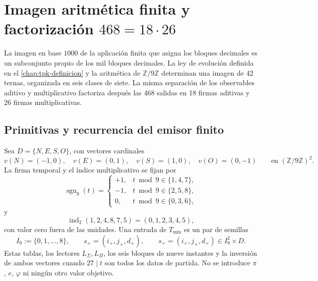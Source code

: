 \chapter[Imagen aritmética finita y factorización \(468=18\cdot26\)]{Imagen aritmética finita y factorización \(468=18\cdot26\)}
\label{chap:alfabeto-42}

La imagen en base \(1000\) de la aplicación finita que asigna los bloques decimales es un
subconjunto propio de los mil bloques decimales. La ley de evolución definida en el
\cref{chap:tpk-definicion} y la aritmética de \(\mathbb Z/9\mathbb Z\)
determinan una imagen de 42 ternas, organizada en seis clases de siete. La
misma separación de los observables aditivo y multiplicativo factoriza después las 468
salidas en 18 firmas aditivas y 26 firmas multiplicativas.

\section{Primitivas y recurrencia del emisor finito}

\begin{definition}
\label{pf84:E02-15}
Sea \(D=\{N,E,S,O\}\), con vectores cardinales
\[
 v(N)=(-1,0),\quad v(E)=(0,1),\quad
 v(S)=(1,0),\quad v(O)=(0,-1)
 \qquad\text{en }(\mathbb Z/9\mathbb Z)^2.
\]
La firma temporal y el índice multiplicativo se fijan por
\[
 \operatorname{sgn}_9(t)=
 \begin{cases}
 +1,&t\bmod9\in\{1,4,7\},\\
 -1,&t\bmod9\in\{2,5,8\},\\
 0,&t\bmod9\in\{0,3,6\},
 \end{cases}
\]
y
\[
 \operatorname{ind}_2(1,2,4,8,7,5)=(0,1,2,3,4,5),
\]
con valor cero fuera de las unidades. Una entrada de \(T_{\min}\) es un par
de semillas
\[
 I_9:=\{0,1,\ldots,8\},\qquad
 s_+=(i_+,j_+,d_+),\qquad s_\times=(i_\times,j_\times,d_\times)
 \in I_9^2\times D.
\]
Estas tablas, los lectores \(L_\Sigma,L_\Pi\), los seis bloques de nueve
instantes y la inversión de ambos vectores cuando \(27\mid t\) son todos los
datos de partida. No se introduce \(\pi\), \(e\), \(\varphi\) ni ningún otro
valor objetivo.
\end{definition}


